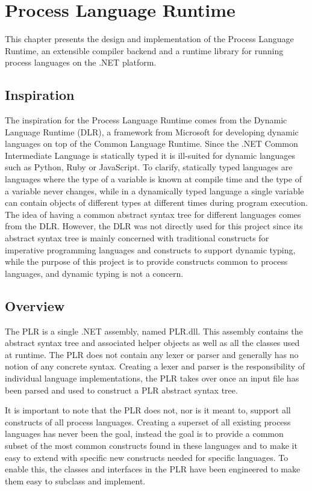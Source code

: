 \chapter{Process Language Runtime}

	This chapter presents the design and implementation of the Process Language 
	Runtime, an extensible compiler backend and a runtime library for running 	
	process languages on the .NET platform. 

\section{Inspiration}

	The inspiration for the Process Language Runtime comes from the Dynamic 
	Language Runtime \cite{dlr} (DLR), a framework from Microsoft for 	
	developing dynamic languages on top of the Common Language Runtime. Since 
	the .NET Common Intermediate Language is statically typed it is ill-suited
	for dynamic languages such as Python, Ruby or JavaScript. To clarify, 
	statically typed languages are languages where the type of a variable is 
	known at compile time and the type of a variable never changes, while in a 
	dynamically typed language a single variable can contain objects of 	
	different types at different times during program execution. The idea of 
	having a common abstract syntax tree for different languages comes from the 
	DLR. However, the DLR was not directly used for this project since its 
	abstract syntax tree is mainly concerned with traditional constructs for 
	imperative programming languages and constructs to support dynamic typing, 
	while the purpose of this project is to provide constructs common to process 
	languages, and dynamic typing is not a concern.

\section{Overview}

	The PLR is a single .NET assembly, named PLR.dll. This assembly contains the 
	abstract syntax tree and associated helper objects as well as all the 
	classes used at runtime. The PLR does not contain any lexer or parser and 
	generally has no notion of any concrete syntax. Creating a lexer and parser 
	is the responsibility of individual language implementations, the PLR takes 
	over once an input file has been parsed and used to construct a PLR abstract 
	syntax tree. 
	
	It is important to note that the PLR does not, nor is it meant 
	to, support all constructs of all process languages. Creating a superset of 
	all existing process languages has never been the goal, instead the goal is 
	to provide a common subset of the most common constructs found in these 
	languages and to make it easy to extend with specific new constructs needed 
	for specific languages. To enable this, the classes and interfaces in the 
	PLR have been engineered to make them easy to subclass and implement.
	
